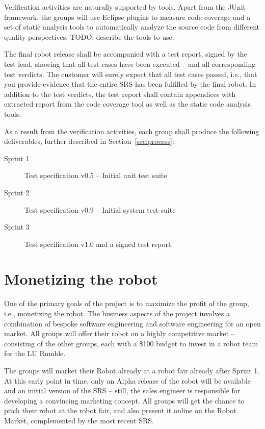 \documentclass{scrreprt}
\begin{document}
Verification activities are naturally supported by tools. Apart from the JUnit framework, the groups will use Eclipse plugins to measure code coverage and a set of static analysis tools to automatically analyze the source code from different quality perspectives. TODO: describe the tools to use.

The final robot release shall be accompanied with a test report, signed by the test lead, showing that all test cases have been executed -- and all corresponding test verdicts. The customer will surely expect that all test cases passed, i.e., that you provide evidence that the entire SRS has been fulfilled by the final robot. In addition to the test verdicts, the test report shall contain appendices with extracted report from the code coverage tool as well as the static code analysis tools.

As a result from the verification activities, each group shall produce the following deliverables, further described in Section~\ref{sec:process}:
\begin{description}
\item[Sprint 1] Test specification v0.5 -- Initial unit test suite
\item[Sprint 2] Test specification v0.9 -- Initial system test suite
\item[Sprint 3] Test specification v1.0 and a signed test report
\end{description}

\section{Monetizing the robot}
One of the primary goals of the project is to maximize the profit of the group, i.e., monetizing the robot. The business aspects of the project involves a combination of bespoke software engineering and software engineering for an open market. All groups will offer their robot on a highly competitive market -- consisting of the other groups, each with a \$100 budget to invest in a robot team for the LU Rumble.

The groups will market their Robot already at a robot fair already after Sprint 1. At this early point in time, only an Alpha release of the robot will be available and an initial version of the SRS -- still, the sales engineer is responsible for developing a convincing marketing concept. All groups will get the chance to pitch their robot at the robot fair, and also present it online on the Robot Market, complemented by the most recent SRS.
\end{document}
